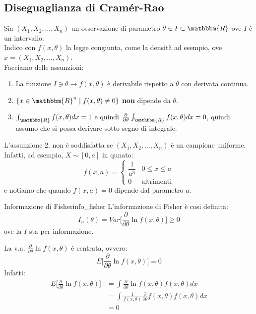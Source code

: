 \documentclass[12pt]{report}
\newcounter{definition}
\newcommand{\nmu}{}
\begin{document}
	\subsection{Diseguaglianza di Cramér-Rao}
	Sia $(X_1, X_2, \dots, X_n)$ un osservazione di parametro $\theta \in I \subset \mathbbm{R}$ ove $I$ è un intervallo. \\
	Indico con $f(x, \theta)$ la legge congiunta, come la densità ad esempio, ove $x = (X_1, X_2, \dots, X_n)$. \\
	Facciamo delle assunzioni:
	\begin{enumerate}
		\item La funzione $I \ni \theta \to f(x, \theta)$ è derivabile rispetto a $\theta$ con derivata continua.
		\item $\{x \in \mathbbm{R}^n \mid f(x, \theta) \neq 0\}$ \textbf{non} dipende da $\theta$.
		\item $\int_\mathbbm{R} f(x, \theta)dx = 1$ e quindi $\frac{\partial}{\partial\theta}\int_\mathbbm{R}f(x, \theta)dx = 0$, quindi assumo che si possa derivare sotto segno di integrale.
	\end{enumerate}
	\begin{note}{}{}
		L'assunzione 2. non è soddisfatta se $(X_1, X_2, \dots, X_n)$ è un campione uniforme. Infatti, ad esempio, $X \sim [0, a]$ in qunato:
		\[
		f(x, a) = \begin{cases}
			\dfrac{1}{a^n} & 0 \leq x \leq a \\
			0 & \text{altrimenti}
		\end{cases}
		\]
		e notiamo che quando $f(x, a) = 0$ dipende dal parametro $a$.
	\end{note}
	\begin{definition}{\nmu Informazione di Fisher}{info_fisher}
		L'informazione di Fisher è cosi definita:
		\[
		I_n(\theta) = Var\Bigg[\frac{\partial}{\partial\theta}\ln f(x, \theta)\Bigg] \geq 0
		\]
		ove la $I$ sta per informazione.
	\end{definition}
	\begin{note}{}{}
		La v.a. $\frac{\partial}{\partial \theta}\ln f(x, \theta)$ è centrata, ovvero:
		\[
		E\Bigg[\frac{\partial}{\partial \theta} \ln f(x, \theta)\Bigg] = 0
		\]
		Infatti:
		\begin{align*}
			E\Bigg[\frac{\partial}{\partial \theta} \ln f(x, \theta)\Bigg] &= \int\frac{\partial}{\partial \theta} \ln f(x, \theta)f(x, \theta)dx \\
			&= \int\frac{1}{f(x, \theta)}\frac{\partial}{\partial \theta}f(x, \theta)f(x, \theta)dx \\
			&= 0
		\end{align*}
	\end{note}
\end{document}
